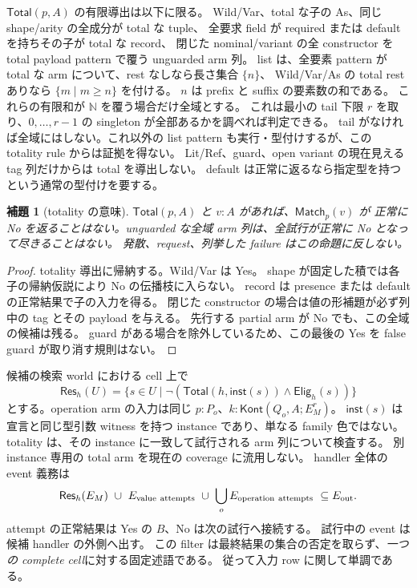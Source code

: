 \documentclass[11pt,a4paper]{article}
\newtheorem{lemma}[definition]{補題}
\begin{document}
\(\mathsf{Total}(p,A)\) の有限導出は以下に限る。
Wild/Var、total な子の As、同じ shape/arity の全成分が total な tuple、
全要求 field が required または default を持ちその子が total な record、
閉じた nominal/variant の全 constructor を total payload pattern で覆う unguarded arm 列。
list は、全要素 pattern が total な arm について、rest なしなら長さ集合 \(\{n\}\)、
Wild/Var/As の total rest ありなら \(\{m\mid m\ge n\}\) を付ける。
\(n\) は prefix と suffix の要素数の和である。
これらの有限和が \(\mathbb N\) を覆う場合だけ全域とする。
これは最小の tail 下限 \(r\) を取り、\(0,\ldots,r-1\) の singleton が全部あるかを調べれば判定できる。
tail がなければ全域にはしない。これ以外の list pattern も実行・型付けするが、この totality rule からは証拠を得ない。
Lit/Ref、guard、open variant の現在見える tag 列だけからは total を導出しない。
default は正常に返るなら指定型を持つという通常の型付けを要する。

\begin{lemma}[totality の意味]
\(\mathsf{Total}(p,A)\) と \(v:A\) があれば、\(\mathsf{Match}_p(v)\) が
正常に No を返ることはない。unguarded な全域 arm 列は、全試行が正常に No となって尽きることはない。
発散、request、列挙した failure はこの命題に反しない。
\end{lemma}
\begin{proof}
totality 導出に帰納する。Wild/Var は Yes。
shape が固定した積では各子の帰納仮説により No の伝播枝に入らない。
record は presence または default の正常結果で子の入力を得る。
閉じた constructor の場合は値の形補題が必ず列中の tag とその payload を与える。
先行する partial arm が No でも、この全域の候補は残る。
guard がある場合を除外しているため、この最後の Yes を false guard が取り消す規則はない。
\end{proof}

候補の検索 world における cell 上で
\[
 \mathsf{Res}_h(U)=\{s\in U\mid
 \neg(\mathsf{Total}(h,\mathsf{inst}(s))\land\mathsf{Elig}_h(s))\}
\]
とする。operation arm の入力は同じ \(p:P_o\)、\(k:\mathsf{Kont}(Q_o,A;E_M^r)\)。
\(\mathsf{inst}(s)\) は宣言と同じ型引数 witness を持つ instance であり、単なる family 色ではない。
totality は、その instance に一致して試行される arm 列について検査する。
別 instance 専用の total arm を現在の coverage に流用しない。
handler 全体の event 義務は
\[
 \mathsf{Res}_h(E_M)\ \cup\ E_{\rm value\ attempts}\
 \cup\ \bigcup_o E_{\rm operation\ attempts}\ \subseteq E_{\rm out}.
\]
attempt の正常結果は Yes の \(B\)、No は次の試行へ接続する。
試行中の event は候補 handler の外側へ出す。
この filter は最終結果の集合の否定を取らず、\emph{一つの complete cell}に対する固定述語である。
従って入力 row に関して単調である。
\end{document}
